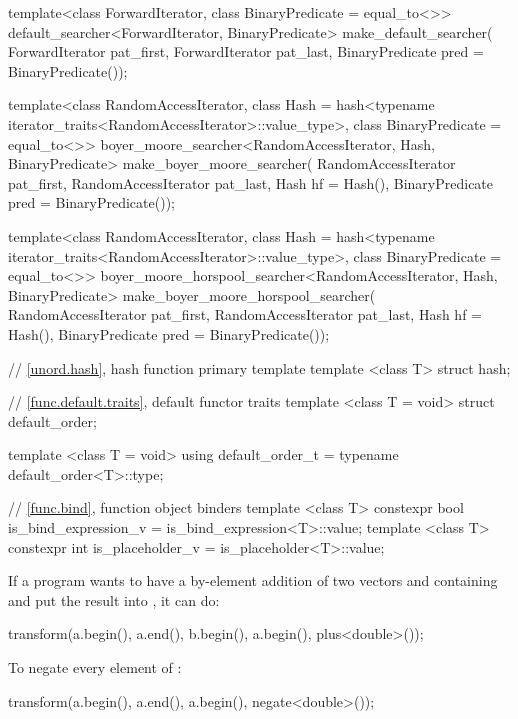 \begin{codeblock}
{  template<class ForwardIterator, class BinaryPredicate = equal_to<>>
    default_searcher<ForwardIterator, BinaryPredicate>
      make_default_searcher(
          ForwardIterator pat_first,
          ForwardIterator pat_last,
          BinaryPredicate pred = BinaryPredicate());

  template<class RandomAccessIterator,
           class Hash = hash<typename iterator_traits<RandomAccessIterator>::value_type>,
           class BinaryPredicate = equal_to<>>
    boyer_moore_searcher<RandomAccessIterator, Hash, BinaryPredicate>
      make_boyer_moore_searcher(
          RandomAccessIterator pat_first,
          RandomAccessIterator pat_last,
          Hash hf = Hash(),
          BinaryPredicate pred = BinaryPredicate());

  template<class RandomAccessIterator,
           class Hash = hash<typename iterator_traits<RandomAccessIterator>::value_type>,
           class BinaryPredicate = equal_to<>>
    boyer_moore_horspool_searcher<RandomAccessIterator, Hash, BinaryPredicate>
      make_boyer_moore_horspool_searcher(
          RandomAccessIterator pat_first,
          RandomAccessIterator pat_last,
          Hash hf = Hash(),
          BinaryPredicate pred = BinaryPredicate());

  // \ref{unord.hash}, hash function primary template
  template <class T>
    struct hash;

  // \ref{func.default.traits}, default functor traits
  template <class T = void>
    struct default_order;

  template <class T = void>
    using default_order_t = typename default_order<T>::type;

  // \ref{func.bind}, function object binders
  template <class T>
    constexpr bool is_bind_expression_v = is_bind_expression<T>::value;
  template <class T>
    constexpr int is_placeholder_v = is_placeholder<T>::value;
}
\end{codeblock}

\pnum
\begin{example}
If a \Cpp program wants to have a by-element addition of two vectors 
and  containing  and put the result into ,
it can do:

\begin{codeblock}
transform(a.begin(), a.end(), b.begin(), a.begin(), plus<double>());
\end{codeblock}
\end{example}

\pnum
\begin{example}
To negate every element of :

\begin{codeblock}
transform(a.begin(), a.end(), a.begin(), negate<double>());
\end{codeblock}

\end{example}

